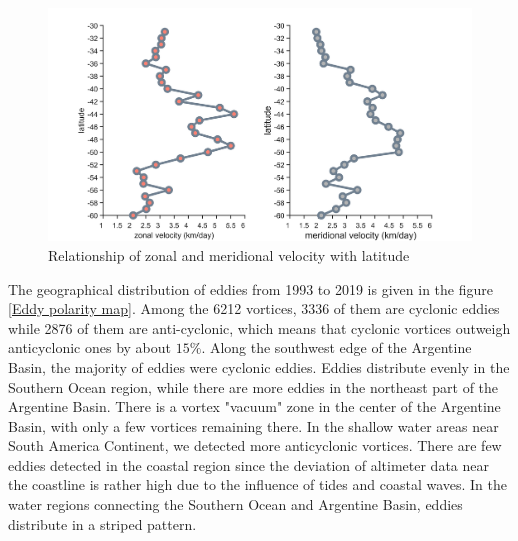 \begin{figure}
    \centering
    \includegraphics[width = 15cm]{chapter/figure/eddy velocity vs latitude.png}
    \caption{Relationship of zonal and meridional velocity with latitude}
    \label{Relationship of zonal and meridional velocity with latitude}
\end{figure}

The geographical distribution of eddies from 1993 to 2019 is given in the figure \ref{Eddy polarity map}. Among the 6212 vortices, 3336 of them are cyclonic eddies while 2876 of them are anti-cyclonic, which means that cyclonic vortices outweigh anticyclonic ones by about $15\%$. Along the southwest edge of the Argentine Basin, the majority of eddies were cyclonic eddies. Eddies distribute evenly in the Southern Ocean region, while there are more eddies in the northeast part of the Argentine Basin. There is a vortex "vacuum" zone in the center of the Argentine Basin, with only a few vortices remaining there. In the shallow water areas near South America Continent, we detected more anticyclonic vortices. There are few eddies detected in the coastal region since the deviation of altimeter data near the coastline is rather high due to the influence of tides and coastal waves. In the water regions connecting the Southern Ocean and Argentine Basin, eddies distribute in a striped pattern.

